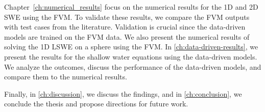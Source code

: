 Chapter~\ref{ch:numerical_results} focus on the numerical results for the 1D and 2D SWE using the FVM.
To validate these results, we compare the FVM outputs with test cases from the literature. Validation is crucial since the data-driven models are trained on the FVM data.
We also present the numerical results of solving the 1D LSWE on a sphere using the FVM.
In \autoref{ch:data-driven-results}, we present the results for the shallow water equations using the data-driven models.
We analyze the outcomes, discuss the performance of the data-driven models, and compare them to the numerical results.

Finally, in \autoref{ch:discussion}, we discuss the findings, and in \autoref{ch:conclusion}, we conclude the thesis and propose directions for future work.


